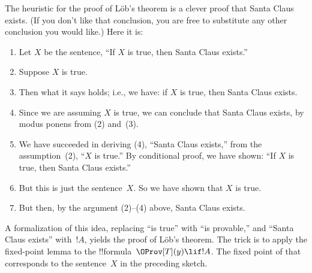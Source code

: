 \documentclass[../../../include/open-logic-section]{subfiles}
\begin{document}
\begin{explain}
The heuristic for the proof of L\"ob's theorem is a clever proof that
Santa Claus exists. (If you don't like that conclusion, you are free
to substitute any other conclusion you would like.) Here it is:
\begin{enumerate}
\item Let $X$ be the sentence, ``If $X$ is true, then Santa Claus
  exists.''
\item Suppose $X$ is true.
\item Then what it says holds; i.e., we have: if $X$ is true, then
  Santa Claus exists.
\item Since we are assuming $X$ is true, we can conclude that
  Santa Claus exists, by modus ponens from (2) and~(3).
\item We have succeeded in deriving (4), ``Santa Claus exists,'' from
  the assumption~(2), ``$X$ is true.'' By conditional proof, we have
  shown: ``If $X$ is true, then Santa Claus exists.''
\item But this is just the sentence~$X$. So we have shown that $X$ is
  true.
\item But then, by the argument (2)--(4) above, Santa Claus exists.
\end{enumerate}
A formalization of this idea, replacing ``is true'' with ``is
provable,'' and ``Santa Claus exists'' with~$!A$, yields the proof of
L\"ob's theorem. The trick is to apply the fixed-point lemma to the
!!{formula}~$\OProv[T](y) \lif !A$. The fixed point of that
corresponds to the sentence~$X$ in the preceding sketch.
\end{explain}
\end{document}
